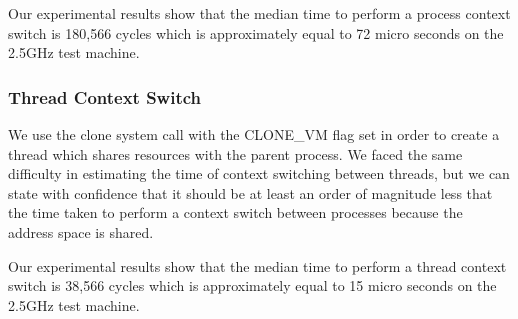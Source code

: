 Our experimental results show that the median time to perform a process context
switch is 180,566 cycles which is approximately equal to 72 micro seconds on the
2.5GHz test machine. 

\subsubsection{Thread Context Switch}
We use the clone system call with the CLONE\_VM flag set in order to create a
thread which shares resources with the parent process. We faced the same
difficulty in estimating the time of context switching between threads, but we
can state with confidence that it should be at least an order of magnitude less
that the time taken to perform a context switch between processes because the
address space is shared.

Our experimental results show that the median time to perform a thread context
switch is 38,566 cycles which is approximately equal to 15 micro seconds on the
2.5GHz test machine.
